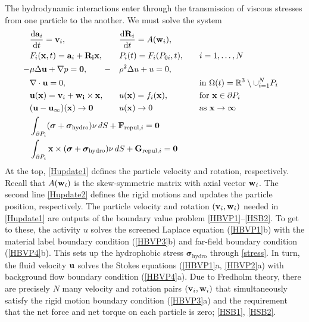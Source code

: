 The hydrodynamic interactions enter through the transmission of viscous stresses from one particle to the another.
We must solve the system 
\begin{alignat}{3}
\label{Hupdate1}  & \frac{\dif {\bf a}_i}{\dif t} = {\bf v}_i,      &&  \frac{\dif {\bf R}_i}{\dif t}  = A({\bf w}_i),\quad        \\
\label{Hupdate2}  & F_i({\bf x},t) = {\bf a}_i + {\bf R_i}{\bf x},  && P_i(t) = F_i(P_{0i},t), \quad && i = 1,\dots, N             \\
\label{HBVP1} -& \mu \Delta {\bf u} + \nabla p = {\bf 0} , \quad \quad -&& \rho^2 \Delta u +u = 0, \\
\label{HBVP2}  & \nabla \cdot {\bf u} = 0,                       &&                                                                  && \text{in } \Omega(t) = \mathbb{R}^3 \setminus \cup_{i=1}^N P_i\\
\label{HBVP3}  & {\bf u }({\bf x}) = {\bf v}_i + {\bf w_i}\times {\bf x} , \quad                &&  u({\bf x}) = f_i({\bf x}),\quad  && \text{for } {\bf x} \in \partial P_i\\
\label{HBVP4}  & ({\bf u } - {\bf u}_{\infty})({\bf x}) \to {\bf 0} && u({\bf x}) \to 0 && \text{as } {\bf x} \to \infty\\
\label{HSB1}   & \int_{\partial P_i} (\boldsymbol{\sigma}  + \boldsymbol{\sigma}_{\text{hydro}})\nu \,dS + {\bf F}_{\text{repul},i} = {\bf 0}\span  \span\\
\label{HSB2}   & \int_{\partial P_i} {\bf x} \times (\boldsymbol{\sigma}  + \boldsymbol{\sigma}_{\text{hydro}})\nu \,dS + {\bf G}_{\text{repul},i} = {\bf 0} \span \span
\end{alignat}
At the top, \eqref{Hupdate1} defines the particle velocity and rotation, respectively. Recall that $A({\bf w}_i)$ is the skew-symmetric matrix with axial vector ${\bf w}_i$.
The second line \eqref{Hupdate2} defines the rigid motions and updates the particle position, respectively. 
The particle velocity and rotation $({\bf v}_i, {\bf w}_i)$ needed in \eqref{Hupdate1} are outputs of the boundary value problem \eqref{HBVP1}--\eqref{HSB2}.
To get to these, the activity $u$ solves the screened Laplace equation (\ref{HBVP1}b) with the material label boundary condition (\ref{HBVP3}b)
and far-field boundary condition (\ref{HBVP4}b).
This sets up the hydrophobic stress $\boldsymbol{\sigma}_{\text{hydro}}$ through \eqref{stress}.
In turn, the fluid velocity ${\bf u}$ solves the Stokes equations (\ref{HBVP1}a, \ref{HBVP2}a)
with background flow boundary condition (\ref{HBVP4}a).
Due to Fredholm theory, there are precisely $N$ many velocity and rotation pairs $({\bf v}_i, {\bf w}_i)$
that simultaneously satisfy the rigid motion boundary condition (\ref{HBVP3}a) and
the requirement that the net force and net torque on each particle is zero; \eqref{HSB1}, \eqref{HSB2}. 




